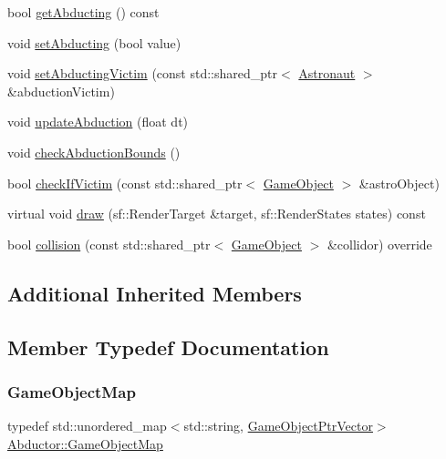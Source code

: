 \begin{DoxyCompactItemize}
\item 
bool \hyperlink{class_abductor_ac0c62963a2e8bdac8c34bfb2a2c0b868}{get\+Abducting} () const
\item 
void \hyperlink{class_abductor_a1069f5de8e0696be938a741f4b931855}{set\+Abducting} (bool value)
\item 
void \hyperlink{class_abductor_a20e45bb3b4a18f7d5baeb697d1e5b1d5}{set\+Abducting\+Victim} (const std\+::shared\+\_\+ptr$<$ \hyperlink{class_astronaut}{Astronaut} $>$ \&abduction\+Victim)
\item 
void \hyperlink{class_abductor_aa9e1628fe605674f599b1ff535c31ac1}{update\+Abduction} (float dt)
\item 
void \hyperlink{class_abductor_a1a0d06816d3572995a0ce1e0426c6d68}{check\+Abduction\+Bounds} ()
\item 
bool \hyperlink{class_abductor_acbe9315d3199bb9231c0a3d45d07d8f6}{check\+If\+Victim} (const std\+::shared\+\_\+ptr$<$ \hyperlink{class_game_object}{Game\+Object} $>$ \&astro\+Object)
\item 
virtual void \hyperlink{class_abductor_aebaf5c5a2882f41c8e1ed1b18f80e3d1}{draw} (sf\+::\+Render\+Target \&target, sf\+::\+Render\+States states) const
\item 
bool \hyperlink{class_abductor_a247dff8e49fc656700c8cb16ed08252d}{collision} (const std\+::shared\+\_\+ptr$<$ \hyperlink{class_game_object}{Game\+Object} $>$ \&collidor) override
\end{DoxyCompactItemize}
\subsection*{Additional Inherited Members}


\subsection{Member Typedef Documentation}
\mbox{\label{class_abductor_a15ce0d62a23ac0c3e335874ff4286f5f}} 
\subsubsection{\texorpdfstring{Game\+Object\+Map}{GameObjectMap}}
{\footnotesize\ttfamily typedef std\+::unordered\+\_\+map$<$std\+::string, \hyperlink{class_abductor_a2fc54e0ab08037996dd212d4d2d0443f}{Game\+Object\+Ptr\+Vector}$>$ \hyperlink{class_abductor_a15ce0d62a23ac0c3e335874ff4286f5f}{Abductor\+::\+Game\+Object\+Map}}

